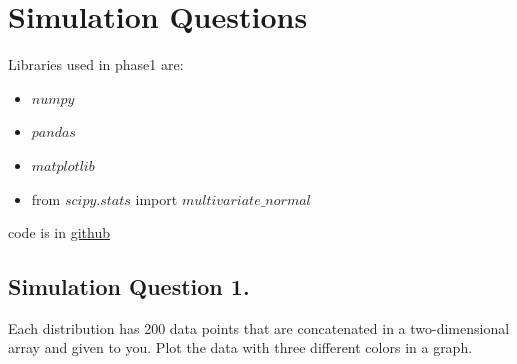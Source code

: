 \documentclass[12pt]{article}
\begin{document}
\clearpage

\section{Simulation Questions}
Libraries used in phase1 are:
\begin{itemize}
    \item $numpy$
    \item $pandas$
    \item $matplotlib$
    \item from $scipy.stats$ import $multivariate\_normal$
\end{itemize}
code is in \href{https://github.com/amirrezavelae/Introduction-to-Machine-Learning/blob/master/IML_Project/Phase1/code.ipynb}{github} \\
\subsection{Simulation Question 1.}
Each distribution has 200 data points that are concatenated in a two-dimensional array and given to you. Plot the data with three different colors in a graph.
\end{document}
